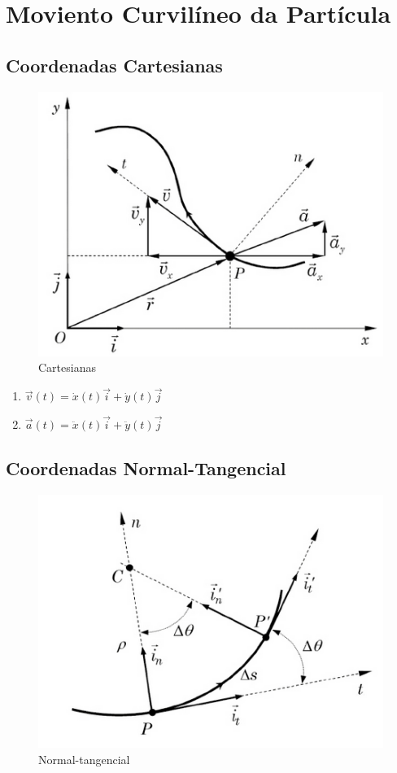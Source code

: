 \documentclass[a4paper, 12pt]{article}
\begin{document}
\section{Moviento Curvilíneo da Partícula}
	\subsection{Coordenadas Cartesianas}
		\begin{figure}[h]
			\center
			\includegraphics[scale=0.5]{imagens/c.png} 
			\caption{Cartesianas}
		\end{figure}	
		
		\begin{enumerate}
			\item $\vec{v}(t) = \dot{x}(t)\vec{i} + \dot{y}(t)\vec{j}$
			\item $\vec{a}(t) = \ddot{x}(t)\vec{i} + \ddot{y}(t)\vec{j}$
		\end{enumerate}
	\subsection{Coordenadas Normal-Tangencial}
		\begin{figure}[h]
			\center
			\includegraphics[scale=0.5]{imagens/t.png} 
			\caption{Normal-tangencial}
		\end{figure}		
\end{document}
